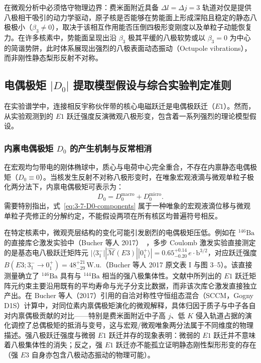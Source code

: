 在微观分析中必须恪守物理边界：费米面附近具备 $\Delta l = \Delta j = 3$ 轨道对仅是提供八极相干吸引的动力学驱动，原子核是否能够在势能面上形成深陷且稳定的静态八极极小（$\beta_3 \ne 0$），取决于该相互作用能否压倒四极形变刚度以及单粒子动能恢复力。在许多核素中，势能面呈现出沿 $\beta_3$ 极其平缓的八极软势或以 $\beta_3=0$ 为中心的简谐势阱，此时体系展现出强烈的八极表面动态振动（Octupole vibrations），而非刚性静态梨形反射不对称。

\subsection{电偶极矩 $|D_0|$ 提取模型假设与综合实验判定准则}\label{sec:3-7-5}

在实验谱学中，连接相反宇称伙伴带的核心电磁跃迁是电偶极跃迁（$E1$）。然而，从实验观测到的 $E1$ 跃迁强度反演微观八极形变，包含着一系列强烈的理论模型假设。

\subsubsection{内禀电偶极矩 $D_0$ 的产生机制与反常相消}

在宏观均匀带电的刚体椭球中，质心与电荷中心完全重合，不存在内禀静态电偶极矩（$D_0 \equiv 0$）。当核发生反射不对称八极形变时，在唯象宏观液滴与微观单粒子极化两分法下，内禀电偶极矩可表示为：
\begin{equation}\label{eq:3-7-D0-components}
D_0 = D_0^{\text{macro}} + D_0^{\text{micro}}.
\end{equation}
需要特别指出，式~\eqref{eq:3-7-D0-components} 属于一种唯象的宏观液滴位移与微观单粒子壳修正的分解约定，不能假设两项在所有核区均普遍符号相反。

在特定核素中，微观壳层结构的变化可能引发剧烈的电偶极矩压低。例如在 $^{146}\mathrm{Ba}$ 的直接库仑激发实验中（Bucher 等人 2017）~\cite{bucher-2017-146ba-direct-octupole}，多步 Coulomb 激发实验直接测定的是基态电八极跃迁矩阵元 $|\langle 3_1^- || \hat{\mathcal{M}}(E3) || 0_1^+ \rangle| = 0.65_{-0.20}^{+0.14} \, e\cdot\mathrm{b}^{3/2}$，对应跃迁强度 $B(E3; 3_1^- \to 0_1^+) = 48_{-29}^{+21} \, \mathrm{W.u.}$（Bucher 等人 2017 原文表 I 与图 3--5）。该直接测量确立了 $^{146}\mathrm{Ba}$ 具有与 $^{144}\mathrm{Ba}$ 相当的强八极集体性。文献中所列出的 $E1$ 跃迁矩阵元约束主要沿用既有的平均寿命与光子分支比数据，而非该次库仑激发直接独立产出。在 Bucher 等人（2017）引用的自洽对称性守恒组态混合（SCCM，Gogny D1S）计算中，对同位素内禀偶极矩演化的微观解释，具体归因于质子与中子各自对内禀偶极贡献的对比——特别是费米面附近中子高 $j$、低 $K$ 侵入轨道占据的演化调控了总偶极矩的抵消与变号，这与宏观/微观唯象两分法属于不同维度的物理描述。强八极跃迁强度与微弱 $E1$ 跃迁并存的现象表明：微弱的 $E1$ 跃迁并不意味着八极集体性的消失；反之，强 $E1$ 跃迁亦不能孤立证明静态刚性梨形形变的存在（强 $E3$ 自身亦包含八极动态振动的物理可能）。

